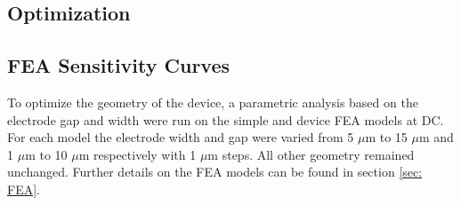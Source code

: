 \clearpage

\subsection{Optimization}
\label{sec:optimization_results}

\subsection*{FEA Sensitivity Curves}

\par To optimize the geometry of the device, a parametric analysis based on the electrode gap and width were run on the simple and device FEA models at DC. For each model the electrode width and gap were varied from 5 $\mu$m to 15 $\mu$m and 1 $\mu$m to 10 $\mu$m respectively with 1 $\mu$m steps. All other geometry remained unchanged. Further details on the FEA models can be found in section \ref{sec: FEA}.

